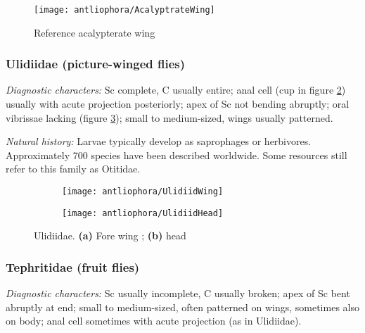 \begin{figure}[ht!]
  \centering
    \texttt{[image: antliophora/AcalyptrateWing]}
  \caption{Reference acalypterate wing \citep[][Fig. 4.59]{mcalpine1981manual}}
  \label{fig:acalypteratewing}
\end{figure}

\subsubsection{Ulidiidae (picture-winged flies)}
\noindent{}\textit{Diagnostic characters:} Sc complete, C usually entire; anal cell (cup in figure \ref{fig:ulidiid1}) usually with acute projection posteriorly; apex of Sc not bending abruptly; oral vibrissae lacking (figure \ref{fig:ulidiid2}); small to medium-sized, wings usually patterned.\vspace{3mm}

\noindent{}\textit{Natural history:} Larvae typically develop as saprophages or herbivores. Approximately 700 species have been described worldwide. Some resources still refer to this family as Otitidae.

\begin{figure}[ht!]
    \centering
    \begin{subfigure}[ht!]{0.47\textwidth}
        \texttt{[image: antliophora/UlidiidWing]}
        \caption{}
        \label{fig:ulidiid1}
    \end{subfigure}
    \qquad
    \begin{subfigure}[ht!]{0.26\textwidth}
        \texttt{[image: antliophora/UlidiidHead]}
        \caption{}
        \label{fig:ulidiid2}
    \end{subfigure}
    \caption{Ulidiidae. \textbf{(a)} Fore wing \citep[][Fig. 63.15]{mcalpine1981manualv2}; \textbf{(b)} head \citep[][Fig. 63.7]{mcalpine1981manualv2}}\label{fig:ulidiids}
\end{figure}

\subsubsection{Tephritidae (fruit flies)}
\noindent{}\textit{Diagnostic characters:} Sc usually incomplete, C usually broken; apex of Sc bent abruptly at end; small to medium-sized, often patterned on wings, sometimes also on body; anal cell sometimes with acute projection (as in Ulidiidae).\vspace{3mm}


